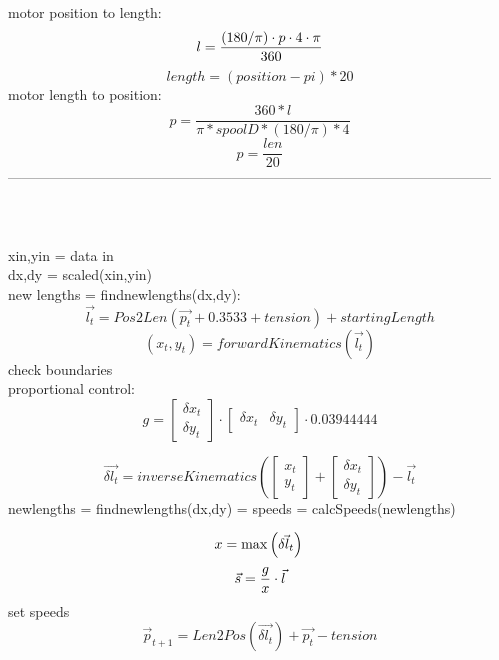 \documentclass{article}
\begin{document}
motor position to length: 
\[
l = \frac{(180/\pi)\cdot p \cdot 4 \cdot \pi }{360}\\
\]
\[
length = (position-pi)*20
\]
motor length to position: 
\[
p = \frac{360*l}{\pi*spoolD*(180/\pi)*4}
\]
\[
p = \frac{len}{20}
\]
--------------------------------------------------------------------------------------------------------\\
\\
\\
\\
\newpage
xin,yin = data in\\
dx,dy = scaled(xin,yin)\\
new lengths = findnewlengths(dx,dy):
	\[
	\vec{l_t} = Pos2Len
	\left(
	\vec{p_t} + 0.3533 + tension
	\right) + startingLength
	\]
	\[
	(x_t,y_t) = forwardKinematics \left(
	\vec{l_t}
	\right)
	\]
	check boundaries\\
	proportional control: \[
	g = 
	\begin{bmatrix}
	\delta{x_t}\\
	\delta{y_t}
	\end{bmatrix}
	\cdot
	\begin{bmatrix}
	\delta{x_t} & \delta{y_t}
	\end{bmatrix}
	\cdot 
	0.03944444
	\]
	
	
	\[
	\vec{\delta{l_t}} = inverseKinematics \left(
	\begin{bmatrix}
	x_t\\
	y_t
	\end{bmatrix}
	+ 
	\begin{bmatrix}
	\delta{x_t}\\
	\delta{y_t}
	\end{bmatrix}
	\right)
	- \vec{l_t}
	\]
	newlengths = findnewlengths(dx,dy) = 
	speeds = calcSpeeds(newlengths)
	
\[
	x = \max\left(\vec{\delta{l_t}}\right)\\\\
	\]\[
	\vec{s} = \frac{g}{x}\cdot \vec{l}\\	
\]
	set speeds
	\[
	\vec{p}_{t+1} = Len2Pos \left(
	\vec{\delta{l_t}}
	\right)
	+ \vec{p_t} - tension
	\]
	
\end{document}
